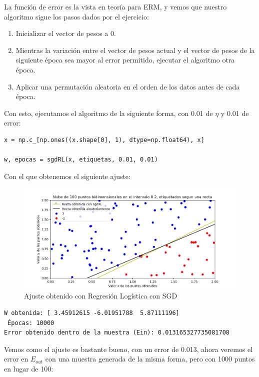 \documentclass[12pt, spanish]{article}
\begin{document}
La función de error es la vista en teoría para ERM, y vemos que nuestro algoritmo sigue los pasos dados por el ejercicio:

\begin{enumerate}
	\item Inicializar el vector de pesos a 0.
	\item Mientras la variación entre el vector de pesos actual y el vector de pesos de la siguiente época sea mayor al error permitido, ejecutar el algoritmo otra época.
	\item Aplicar una permutación aleatoria en el orden de los datos antes de cada época.
\end{enumerate}

Con esto, ejecutamos el algoritmo de la siguiente forma, con 0.01 de $\eta$ y 0.01 de error:

\begin{lstlisting}
x = np.c_[np.ones((x.shape[0], 1), dtype=np.float64), x]

w, epocas = sgdRL(x, etiquetas, 0.01, 0.01)
\end{lstlisting}

Con el que obtenemos el siguiente ajuste:

\begin{figure}[H]
  \centering
      \includegraphics[scale = 0.70]{ej-2-SGR-RL.png}
 		 \caption{Ajuste obtenido con Regresión Logística con SGD}
  		\label{fig:ej2-SGR-RL}

\end{figure}

\begin{lstlisting}
W obtenida: [ 3.45912615 -6.01951788  5.87111196]
 Épocas: 10000
Error obtenido dentro de la muestra (Ein): 0.013165327735081708
\end{lstlisting}

Vemos como el ajuste es bastante bueno, con un error de 0.013, ahora veremos el error en $E_{out}$ con una muestra generada de la misma forma, pero con 1000 puntos en lugar de 100:
\end{document}
